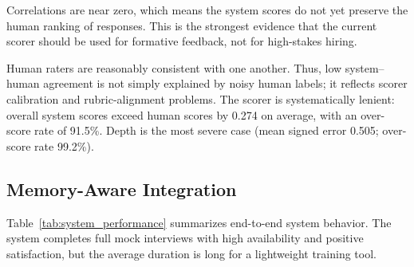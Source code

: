 ﻿\documentclass[final,3p,times,authoryear]{elsarticle}
\begin{document}
\noindent Correlations are near zero, which means the system scores do not yet preserve the human ranking of responses. This is the strongest evidence that the current scorer should be used for formative feedback, not for high-stakes hiring.

\begin{table}[H]
\centering
\caption{Human inter-rater reliability. Generated by \texttt{calc\_extended\_experiments.py}.}
\label{tab:human_reliability}
\end{table}

\noindent Human raters are reasonably consistent with one another. Thus, low system--human agreement is not simply explained by noisy human labels; it reflects scorer calibration and rubric-alignment problems. The scorer is systematically lenient: overall system scores exceed human scores by 0.274 on average, with an over-score rate of 91.5\%. Depth is the most severe case (mean signed error 0.505; over-score rate 99.2\%).

\subsection{Memory-Aware Integration}

\noindent Table~\ref{tab:system_performance} summarizes end-to-end system behavior. The system completes full mock interviews with high availability and positive satisfaction, but the average duration is long for a lightweight training tool.
\end{document}
